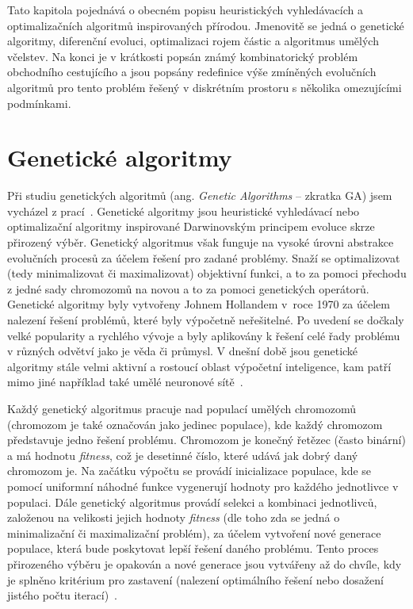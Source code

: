 Tato kapitola pojednává o obecném popisu heuristických vyhledávacích a optimalizačních algoritmů inspirovaných přírodou. Jmenovitě se jedná o genetické algoritmy, diferenční evoluci, optimalizaci rojem částic a algoritmus umělých včelstev. Na konci je v krátkosti popsán známý kombinatorický problém obchodního cestujícího a jsou popsány redefinice výše zmíněných evolučních algoritmů pro tento problém řešený v diskrétním prostoru s několika omezujícími podmínkami.


\section{Genetické algoritmy}
Při studiu genetických algoritmů (ang. \emph{Genetic Algorithms} -- zkratka GA) jsem vycházel z prací~\cite{GAoptimisModel, GAstudy, introductionEvo, optimisationOrderPickingGA}. Genetické algoritmy jsou heuristické vyhledávací nebo optimalizační algoritmy inspirované Darwinovským principem evoluce skrze přirozený výběr. Genetický algoritmus však funguje na vysoké úrovni abstrakce evolučních procesů za účelem  řešení pro zadané problémy. Snaží se optimalizovat (tedy minimalizovat či maximalizovat) objektivní funkci, a to za pomoci přechodu z jedné sady chromozomů na novou a to za pomoci genetických operátorů. Genetické algoritmy byly vytvořeny Johnem Hollandem v~roce 1970 za účelem nalezení řešení problémů, které byly výpočetně neřešitelné. Po uvedení se dočkaly velké popularity a rychlého vývoje a byly aplikovány k řešení celé řady problému v různých odvětví jako je věda či průmysl. V dnešní době jsou genetické algoritmy stále velmi aktivní a rostoucí oblast výpočetní inteligence, kam patří mimo jiné například také umělé neuronové sítě~\cite{GAoptimisModel}.

Každý genetický algoritmus pracuje nad populací umělých chromozomů (chromozom je také označován jako jedinec populace), kde každý chromozom představuje jedno řešení problému. Chromozom je konečný řetězec (často binární) a má hodnotu \emph{fitness}, což je desetinné číslo, které udává jak dobrý daný chromozom je. Na začátku výpočtu se provádí inicializace populace, kde se pomocí uniformní náhodné funkce vygenerují hodnoty pro každého jednotlivce v populaci. Dále genetický algoritmus provádí selekci a kombinaci jednotlivců, založenou na velikosti jejich hodnoty \emph{fitness} (dle toho zda se jedná o minimalizační či maximalizační problém), za účelem vytvoření nové generace populace, která bude poskytovat lepší řešení daného problému. Tento proces přirozeného výběru je opakován a nové generace jsou vytvářeny až do chvíle, kdy je splněno kritérium pro zastavení (nalezení optimálního řešení nebo dosažení jistého počtu iterací)~\cite{GAoptimisModel}.

